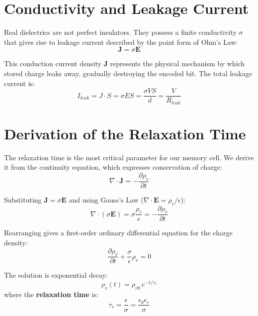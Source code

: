 \documentclass[12pt,a4paper]{report}
\begin{document}
\section{Conductivity and Leakage Current}

Real dielectrics are not perfect insulators. They possess a finite conductivity $\sigma$ that gives rise to leakage current described by the point form of Ohm's Law:
\begin{equation}
    \mathbf{J} = \sigma \mathbf{E}
    \label{eq:ohms_point}
\end{equation}

This conduction current density $\mathbf{J}$ represents the physical mechanism by which stored charge leaks away, gradually destroying the encoded bit. The total leakage current is:
\begin{equation}
    I_{leak} = J \cdot S = \sigma E S = \frac{\sigma V S}{d} = \frac{V}{R_{leak}}
    \label{eq:I_leak}
\end{equation}

\section{Derivation of the Relaxation Time}

The relaxation time is the most critical parameter for our memory cell. We derive it from the continuity equation, which expresses conservation of charge:
\begin{equation}
    \nabla \cdot \mathbf{J} = -\frac{\partial \rho_v}{\partial t}
    \label{eq:continuity}
\end{equation}

Substituting $\mathbf{J} = \sigma \mathbf{E}$ and using Gauss's Law ($\nabla \cdot \mathbf{E} = \rho_v/\epsilon$):
\begin{equation}
    \nabla \cdot (\sigma \mathbf{E}) = \sigma \frac{\rho_v}{\epsilon} = -\frac{\partial \rho_v}{\partial t}
    \label{eq:continuity_sub}
\end{equation}

Rearranging gives a first-order ordinary differential equation for the charge density:
\begin{equation}
    \frac{\partial \rho_v}{\partial t} + \frac{\sigma}{\epsilon} \rho_v = 0
    \label{eq:rho_ode}
\end{equation}

The solution is exponential decay:
\begin{equation}
    \rho_v(t) = \rho_{v0} \, e^{-t/\tau_r}
    \label{eq:rho_decay}
\end{equation}
where the \textbf{relaxation time} is:
\begin{equation}
    \boxed{\tau_r = \frac{\epsilon}{\sigma} = \frac{\epsilon_0 \epsilon_r}{\sigma}}
    \label{eq:tau_r}
\end{equation}
\end{document}
